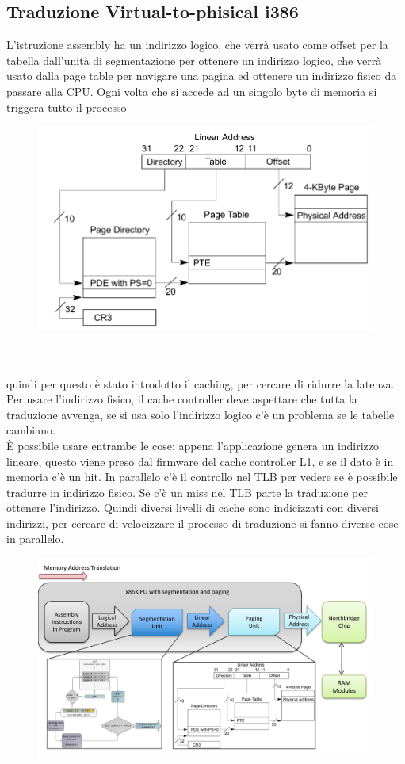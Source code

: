 \documentclass[12pt, oneside]{extbook} %
\begin{document}
\subsection{Traduzione Virtual-to-phisical i386}
L'istruzione assembly ha un indirizzo logico, che verrà usato come offset per la tabella dall'unità di segmentazione per ottenere un indirizzo logico, che verrà usato dalla page table per navigare una pagina ed ottenere un indirizzo fisico da passare alla CPU. Ogni volta che si accede ad un singolo byte di memoria si triggera tutto il processo\\
\begin{figure}
	\includegraphics[scale=0.4]{immagini/i386_paging.png}
\end{figure}
\\\\
quindi per questo è stato introdotto il caching, per cercare di ridurre la latenza. Per usare l'indirizzo fisico, il cache controller deve aspettare che tutta la traduzione avvenga, se si usa solo l'indirizzo logico c'è un problema se le tabelle cambiano.\\ È possibile usare entrambe le cose: appena l'applicazione genera un indirizzo lineare, questo viene preso dal firmware del cache controller L1, e se il dato è in memoria c'è un hit. In parallelo c'è il controllo nel TLB per vedere se è possibile tradurre in indirizzo fisico. Se c'è un miss nel TLB parte la traduzione per ottenere l'indirizzo. Quindi diversi livelli di cache sono indicizzati con diversi indirizzi, per cercare di velocizzare il processo di traduzione si fanno diverse cose in parallelo.
\begin{figure}[!h]
	\includegraphics[scale=0.3]{immagini/vtp_riassunto.png}
\end{figure}
\end{document}
